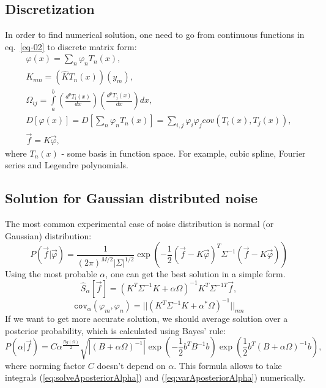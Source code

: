 \documentclass{webofc}
\begin{document}
\subsection{Discretization}

In order to find numerical solution, one need to go from continuous functions in eq.~\ref{eq-02} to discrete matrix form:
\begin{equation}\label{eq:algebr}
	\begin{gathered}
      \varphi(x) = \sum \limits_n \varphi_n T_n(x),\\
      K_{mn} = (\hat{K}T_n(x))(y_m),\\
      \Omega_{ij} = \int\limits_a^b \left(\frac{d^pT_i(x)}{dx}\right)\left(\frac{d^pT_j(x)}{dx}\right)dx,\\
      D[\varphi(x)] = D[\sum \limits_n \varphi_n T_n(x)] = \sum\limits_{i,j} \varphi_i\varphi_j cov(T_i(x), T_j(x)),\\
      \vec{f} = K\vec{\varphi},
    \end{gathered}
\end{equation}
where $T_n(x)$ - some basis in function space. For example, cubic spline, Fourier series and Legendre polynomials.

\subsection{Solution for Gaussian distributed noise}

The most common experimental case of noise distribution is normal (or Gaussian) distribution:
\begin{equation}	\label{eq:gaussP}
	P\left(\vec{f}|\vec{\varphi}\right) = \frac{1}{(2\pi)^{M/2}|\Sigma|^{1/2}} 
    \exp\left(-\frac{1}{2}(\vec{f} - K\vec{\varphi})^T\Sigma^{-1}(\vec{f} - K\vec{\varphi})\right)
\end{equation}
Using  the most probable $\alpha$, one can get the best solution in a simple form.
\begin{equation} \label{eq:analit_solv}
	\hat{S}_{\alpha}[\vec{f}] = (K^T\Sigma^{-1}K+\alpha\Omega)^{-1}K^T\Sigma^{-1T}\vec{f},
\end{equation}
\begin{equation} \label{eq:analit_var}
	\texttt{cov}_{\alpha}(\varphi_m, \varphi_n) = ||(K^T\Sigma^{-1}K+\alpha^*\Omega)^{-1}||_{mn}
\end{equation}
If we want to get more accurate solution, we should average solution over a posterior probability, which is calculated using Bayes' rule: 
\begin{equation}
	\label{eq:alphaaposter}
	P(\alpha|\vec{f}) = C \alpha^{\frac{Rg(\Omega)}{2}}\sqrt{|(B+\alpha\Omega)^{-1}|}\exp(-\frac{1}{2}b^{T}B^{-1}b)\exp(\frac{1}{2}b^{T}(B+\alpha\Omega)^{-1}b),
\end{equation}
where norming factor $C$  doesn't depend on $\alpha$. This formula allows to take integrals (\ref{eq:solveAposteriorAlpha}) and (\ref{eq:varAposteriorAlpha}) numerically.
\end{document}
